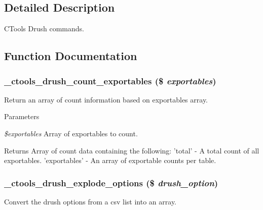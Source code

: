 \subsection{Detailed Description}
CTools Drush commands. 

\subsection{Function Documentation}
\hypertarget{ctools_8drush_8inc_a6319e6e637798f0886e2c008106e1739}{
\subsubsection[{\_\-ctools\_\-drush\_\-count\_\-exportables}]{\setlength{\rightskip}{0pt plus 5cm}\_\-ctools\_\-drush\_\-count\_\-exportables (\$ {\em exportables})}}
\label{ctools_8drush_8inc_a6319e6e637798f0886e2c008106e1739}
Return an array of count information based on exportables array.


\begin{DoxyParams}{Parameters}
\item[{\em \$exportables}]Array of exportables to count.\end{DoxyParams}
\begin{DoxyReturn}{Returns}
Array of count data containing the following: 'total' -\/ A total count of all exportables. 'exportables' -\/ An array of exportable counts per table. 
\end{DoxyReturn}
\hypertarget{ctools_8drush_8inc_aacf474d9507f8bc39ad18da701b890d3}{
\subsubsection[{\_\-ctools\_\-drush\_\-explode\_\-options}]{\setlength{\rightskip}{0pt plus 5cm}\_\-ctools\_\-drush\_\-explode\_\-options (\$ {\em drush\_\-option})}}
\label{ctools_8drush_8inc_aacf474d9507f8bc39ad18da701b890d3}
Convert the drush options from a csv list into an array.


